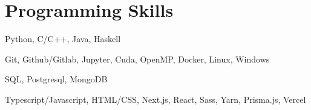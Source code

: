 \section{Programming Skills}
\resumeSubHeadingListStart

{Python, C/C++, Java, Haskell}

{Git, Github/Gitlab, Jupyter, Cuda, OpenMP, Docker, Linux, Windows}

{SQL, Postgresql, MongoDB}

{Typescript/Javascript, HTML/CSS, Next.js, React, Sass, Yarn, Prisma.js, Vercel}

\resumeSubHeadingListEnd
